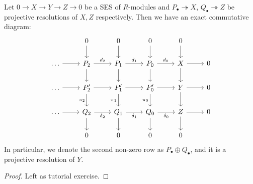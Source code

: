 \begin{thm} 
    Let $0\to X\to Y \to Z\to 0$ be a SES of $R$-modules and $P_\bullet \twoheadrightarrow X$, $Q_\bullet \twoheadrightarrow Z$ be projective resolutions of $X,Z$ respectively. Then we have an exact commutative diagram:
    \[\begin{tikzcd} [sep=small]
	&& 0 && 0 && 0 && 0 \\
	\\
	\dots && {P_2} && {P_1} && {P_0} && X && 0 \\
	\\
	\dots && {P'_2} && {P'_1} && {P'_0} && Y && 0 \\
	\\
	\dots && {Q_2} && {Q_1} && {Q_0} && Z && 0 \\
	\\
	&& 0 && 0 && 0 && 0
	\arrow[from=1-3, to=3-3]
	\arrow[from=1-5, to=3-5]
	\arrow[from=1-7, to=3-7]
	\arrow[from=1-9, to=3-9]
	\arrow[from=3-1, to=3-3]
	\arrow["{d_2}", from=3-3, to=3-5]
	\arrow[from=3-3, to=5-3]
	\arrow["{d_1}", from=3-5, to=3-7]
	\arrow[from=3-5, to=5-5]
	\arrow["{d_0}", from=3-7, to=3-9]
	\arrow[from=3-7, to=5-7]
	\arrow[from=3-9, to=3-11]
	\arrow[from=3-9, to=5-9]
	\arrow[from=5-1, to=5-3]
	\arrow[from=5-3, to=5-5]
	\arrow["{\pi_2}"', from=5-3, to=7-3]
	\arrow[from=5-5, to=5-7]
	\arrow["{\pi_1}"', from=5-5, to=7-5]
	\arrow[from=5-7, to=5-9]
	\arrow["{\pi_0}"', from=5-7, to=7-7]
	\arrow[from=5-9, to=5-11]
	\arrow[from=5-9, to=7-9]
	\arrow[from=7-1, to=7-3]
	\arrow["{\delta_2}"', from=7-3, to=7-5]
	\arrow[from=7-3, to=9-3]
	\arrow["{\delta_1}"', from=7-5, to=7-7]
	\arrow[from=7-5, to=9-5]
	\arrow["{\delta_0}"', from=7-7, to=7-9]
	\arrow[from=7-7, to=9-7]
	\arrow[from=7-9, to=7-11]
	\arrow[from=7-9, to=9-9]
\end{tikzcd}\]
In particular, we denote the second non-zero row as $P_\bullet \oplus Q_\bullet$, and it is a projective resolution of $Y$.
\end{thm}
\begin{proof}
    Left as tutorial exercise.
\end{proof}

